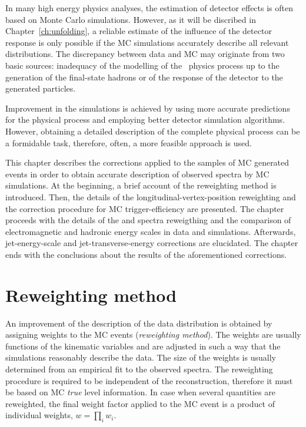 In many high energy physics analyses, the estimation of detector effects is often based on Monte Carlo simulations. However, as it will be discribed in Chapter~\ref{ch:unfolding}, a reliable estimate of the influence of the detector response is only possible if the MC simulations accurately describe all relevant distributions. %
 The discrepancy between data and MC may originate from two basic sources: inadequacy of the modelling of the \ep~physics process up to the generation of the final-state hadrons or of the response of the detector to the generated particles.
 
Improvement in the simulations is achieved by using more accurate predictions for the physical process and employing better detector simulation algorithms. However, obtaining a detailed description of the complete physical process can be a formidable task, therefore, often, a more feasible approach is used.

This chapter describes the corrections applied to the samples of MC generated events in order to obtain accurate description of observed spectra by MC simulations. At the beginning, a brief account of the reweighting method is introduced. Then, the details of the longitudinal-vertex-position reweighting and the correction procedure for MC trigger-efficiency are presented. The chapter proceeds with the details of the \qsq and \etjetb spectra reweigthing and the comparison of electromagnetic and hadronic energy scales in data and simulations. Afterwards, jet-energy-scale and jet-transverse-energy corrections are elucidated. The chapter ends with the conclusions about the results of the aforementioned corrections.

\section{Reweighting method}

An improvement of the description of the data distribution is obtained by assigning weights to the MC events (\emph{reweighting method}). The weights are usually functions of the kinematic variables and are adjusted in such a way that the simulations reasonably describe the data. The size of the weights is usually determined from an empirical fit to the observed spectra. The reweighting procedure is required to be independent of the reconstruction, therefore it must be based on MC \emph{true} level information. In case when several quantities are reweighted, the final weight factor applied to the MC event is a product of individual weights, $w = \prod_i w_i$. 

